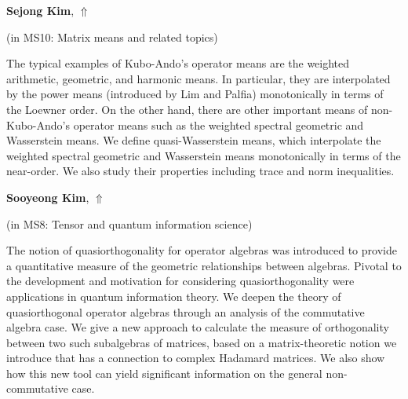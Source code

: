 \documentclass[ILAS2025-program.tex]{subfiles}
\begin{document}
\hypertarget{down0023}{}\begin{ilasabstract}
    
\textbf{Sejong Kim},  \hfill \hyperlink{up0023}{$\Uparrow$}
    
    
(in {\color{mstitle}MS10: Matrix means and related topics})
        
\mtskip
    The typical examples of Kubo-Ando's operator means are the weighted arithmetic, geometric, and harmonic means. In particular, they are interpolated by the power means (introduced by Lim and Palfia) monotonically in terms of the Loewner order. On the other hand, there are other important means of non-Kubo-Ando's operator means such as the weighted spectral geometric and Wasserstein means. We define quasi-Wasserstein means, which interpolate the weighted spectral geometric and Wasserstein means monotonically in terms of the near-order. We also study their properties including trace and norm inequalities.

\end{ilasabstract}
    

\hypertarget{down0251}{}\begin{ilasabstract}
    
\textbf{Sooyeong Kim},  \hfill \hyperlink{up0251}{$\Uparrow$}
    
    
(in {\color{mstitle}MS8: Tensor and quantum information science})
        
\mtskip
    The notion of quasiorthogonality for operator algebras was introduced to provide a quantitative measure of the geometric relationships between algebras. Pivotal to the development and motivation for considering quasiorthogonality were applications in quantum information theory. We deepen the theory of quasiorthogonal operator algebras through an analysis of the commutative algebra case. We give a new approach to calculate the measure of orthogonality between two such subalgebras of matrices, based on a matrix-theoretic notion we introduce that has a connection to complex Hadamard matrices. We also show how this new tool can yield significant information on the general non-commutative case.

\end{ilasabstract}
    
\end{document}
